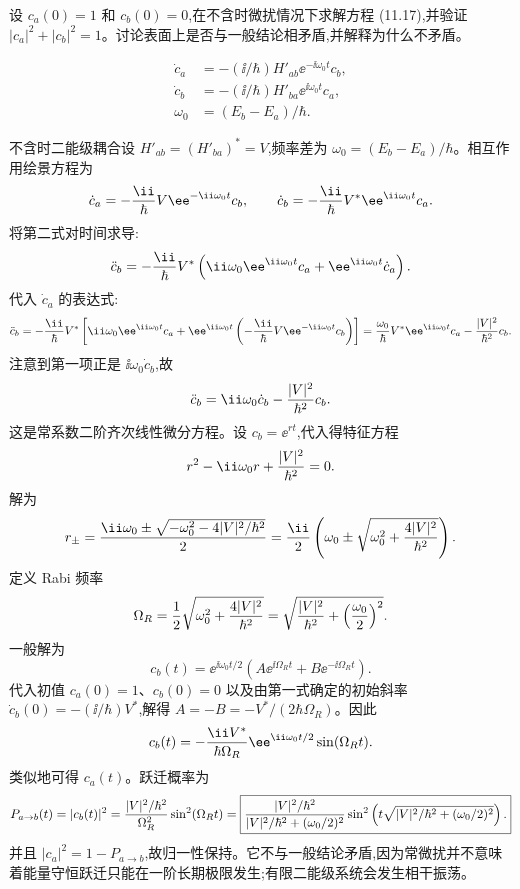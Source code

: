 \begin{question}
设 $c_a(0)=1$ 和 $c_b(0)=0$,在不含时微扰情况下求解方程 (11.17),并验证 $|c_a|^2+|c_b|^2=1$。讨论表面上是否与一般结论相矛盾,并解释为什么不矛盾。

\par\smallskip
{}\[
\begin{aligned}\dot c_a&=-(\ii/\hbar)H'_{ab}\ee^{-\ii\omega_0t}c_b,\\\dot c_b&=-(\ii/\hbar)H'_{ba}\ee^{\ii\omega_0t}c_a,\\\omega_0&=(E_b-E_a)/\hbar.\end{aligned}\]

\begin{solution}
不含时二能级耦合设 $H'_{ab}=(H'_{ba})^*=V$,频率差为 $\omega_0=(E_b-E_a)/\hbar$。相互作用绘景方程为
\[
\dot c_a=-{\ii\over\hbar}V \ee^{-\ii\omega_0t}c_b,
\qquad
\dot c_b=-{\ii\over\hbar}V^* \ee^{\ii\omega_0t}c_a.
\]
将第二式对时间求导:
\[
\ddot c_b=-{\ii\over\hbar}V^*\left(\ii\omega_0 \ee^{\ii\omega_0t}c_a+\ee^{\ii\omega_0t}\dot c_a\right).
\]
代入 $\dot c_a$ 的表达式:
\[
\ddot c_b=-{\ii\over\hbar}V^*\left[\ii\omega_0 \ee^{\ii\omega_0t}c_a
+\ee^{\ii\omega_0t}\left(-{\ii\over\hbar}V \ee^{-\ii\omega_0t}c_b\right)\right]
={\omega_0\over\hbar}V^* \ee^{\ii\omega_0t}c_a-{|V|^2\over\hbar^2}c_b.
\]
注意到第一项正是 $\ii\omega_0\dot c_b$,故
\[
\ddot c_b=\ii\omega_0\dot c_b-{|V|^2\over\hbar^2}c_b.
\]
这是常系数二阶齐次线性微分方程。设 $c_b=\ee^{rt}$,代入得特征方程
\[
r^2-\ii\omega_0 r+{|V|^2\over\hbar^2}=0.
\]
解为
\[
r_\pm={\ii\omega_0\pm\sqrt{-\omega_0^2-4|V|^2/\hbar^2}\over2}
={\ii\over2}\left(\omega_0\pm\sqrt{\omega_0^2+{4|V|^2\over\hbar^2}}\right).
\]
定义 Rabi 频率
\[
\Omega_R={1\over2}\sqrt{\omega_0^2+{4|V|^2\over\hbar^2}}
=\sqrt{{|V|^2\over\hbar^2}+\left({\omega_0\over2}\right)^2}.
\]
一般解为
\[
c_b(t)=\ee^{\ii\omega_0t/2}\left(A \ee^{\ii\Omega_R t}+B \ee^{-\ii\Omega_R t}\right).
\]
代入初值 $c_a(0)=1$、$c_b(0)=0$ 以及由第一式确定的初始斜率 $\dot c_b(0)=-(\ii/\hbar)V^*$,解得 $A=-B=-V^*/(2\hbar\Omega_R)$。因此
\[
c_b(t)=-{\ii V^*\over\hbar\Omega_R}\ee^{\ii\omega_0t/2}\sin(\Omega_R t).
\]
类似地可得 $c_a(t)$。跃迁概率为
\[
P_{a\to b}(t)=|c_b(t)|^2
={|V|^2/\hbar^2\over\Omega_R^2}\sin^2(\Omega_R t)
=\boxed{{|V|^2/\hbar^2\over|V|^2/\hbar^2+(\omega_0/2)^2}
\sin^2\left(t\sqrt{|V|^2/\hbar^2+(\omega_0/2)^2}\right).}
\]
并且 $|c_a|^2=1-P_{a\to b}$,故归一性保持。它不与一般结论矛盾,因为常微扰并不意味着能量守恒跃迁只能在一阶长期极限发生;有限二能级系统会发生相干振荡。
\end{solution}
\end{question}

